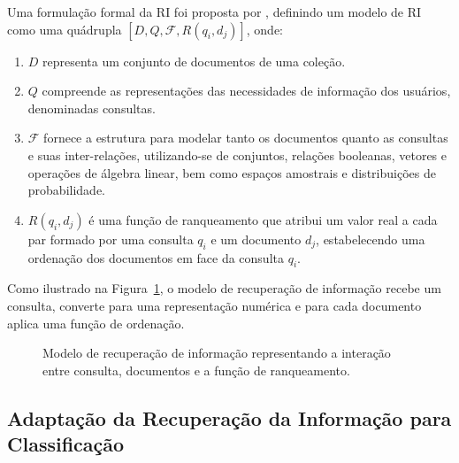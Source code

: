 Uma formulação formal da RI foi proposta por \cite{baeza2013recuperaccao}, definindo um modelo de RI como uma quádrupla \([D,Q,\mathcal{F}, R(q_i,d_j)]\), onde:

\begin{enumerate}
    \item \( D \) representa um conjunto de documentos de uma coleção.
    \item \( Q \) compreende as representações das necessidades de informação dos usuários, denominadas consultas.
    \item \( \mathcal{F} \) fornece a estrutura para modelar tanto os documentos quanto as consultas e suas inter-relações, utilizando-se de conjuntos, relações booleanas, vetores e operações de álgebra linear, bem como espaços amostrais e distribuições de probabilidade.
    \item \( R(q_i,d_j) \) é uma função de ranqueamento que atribui um valor real a cada par formado por uma consulta \( q_i \) e um documento \( d_j \), estabelecendo uma ordenação dos documentos em face da consulta \( q_i \).
\end{enumerate}


Como ilustrado na Figura~\ref{fig:ri_model}, o modelo de recuperação de informação recebe um consulta, converte para uma representação numérica e para cada documento aplica uma função de ordenação.

\begin{figure}[ht]
\centering
{}
\caption{Modelo de recuperação de informação representando a interação entre consulta, documentos e a função de ranqueamento.}
\label{fig:ri_model}
\end{figure}

\subsection{Adaptação da Recuperação da Informação para Classificação}

